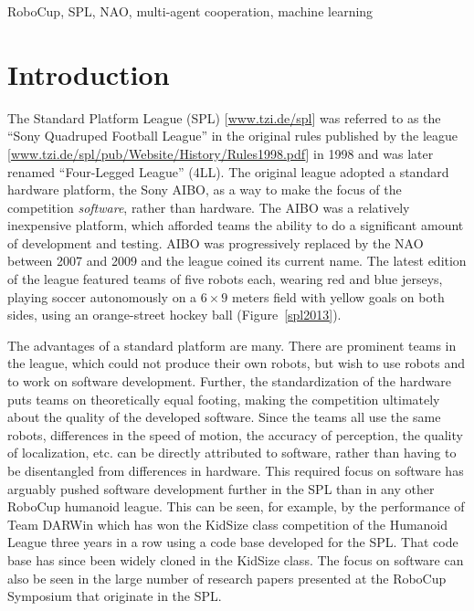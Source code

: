 \documentclass{llncs}
\begin{document}
\begin{keywords}
RoboCup, SPL, NAO, multi-agent cooperation, machine learning
\end{keywords}

\section{Introduction}

The Standard Platform League (SPL) [\url{www.tzi.de/spl}] was referred to as the ``Sony Quadruped Football League''
in the original rules published by the league
[\url{www.tzi.de/spl/pub/Website/History/Rules1998.pdf}] in 1998 and was later renamed ``Four-Legged League'' (4LL).
The original league adopted a standard hardware platform, the Sony AIBO, as a way to make the focus
of the competition \textit{software}, rather than hardware. The AIBO was a relatively
inexpensive platform, which afforded teams the ability to do a significant amount of development
and testing. 
AIBO was progressively replaced by the NAO between 2007 and 2009 and the league coined its current name. The latest edition of the league featured teams of five robots each, wearing red and blue jerseys, playing soccer autonomously on a $6\times9$ meters field with yellow goals on both sides, using an orange-street hockey ball (Figure~\ref{spl2013}).

The advantages of a standard platform are many. There are prominent teams
in the league, which could not produce their own robots, but wish to use
robots and to work on software development. Further, the
standardization of the hardware puts teams on theoretically equal footing, making the
competition ultimately about the quality of the developed software. Since the teams all use the
same robots, differences in the speed of motion, the accuracy of perception, the quality of localization, etc. can
be directly attributed to software, rather than having to be disentangled from differences
in hardware.
This required focus on software
has arguably pushed software development further in the SPL than in any other RoboCup humanoid league. This can be seen, for example, by the performance of Team DARWin which has won the KidSize
class competition of the Humanoid League three years in a row using a code base developed for the SPL. That code base
has since been widely cloned in the KidSize class. The focus on software can also be
seen in the large number of research papers presented at the RoboCup Symposium that originate in the
SPL.
\end{document}
